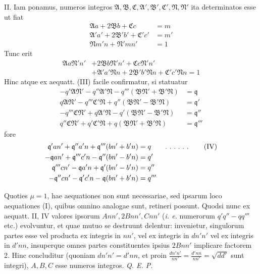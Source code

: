 II. Iam ponamus, numeros integros $\mathfrak{A},\mathfrak{B},\mathfrak{C},\mathfrak{A}',\mathfrak{B}',\mathfrak{C}',\mathfrak{N},\mathfrak{N}'$ ita determinatos esse ut fiat
\[
\begin{aligned}
\mathfrak{A}a+2\mathfrak{B}b+\mathfrak{C}c&=m\\
\mathfrak{A}'a'+2\mathfrak{B}'b'+\mathfrak{C}'c'&=m'\\
\mathfrak{N}m'n+\mathfrak{N}'mn'&=1
\end{aligned}
\]
Tunc erit
\[
\begin{aligned}\mathfrak{A}a\mathfrak{N}'n'&+2\mathfrak{B}b\mathfrak{N}'n'+\mathfrak{C}c\mathfrak{N}'n'\\&+\mathfrak{A}'a'\mathfrak{N}n+2\mathfrak{B}'b'\mathfrak{N}n+\mathfrak{C}'c'\mathfrak{N}n=1\end{aligned}
\]
Hinc atque ex aequatt. (III) facile confirmatur, si statuatur
\[
\begin{aligned}
-q'\mathfrak{A}\mathfrak{N}'-q''\mathfrak{A}'\mathfrak{N}-q'''(\mathfrak{B}\mathfrak{N}'+\mathfrak{B}'\mathfrak{N})&=\mathfrak{q}\\
q\mathfrak{A}\mathfrak{N}'-q'''\mathfrak{C}'\mathfrak{N}+q''(\mathfrak{B}\mathfrak{N}'-\mathfrak{B}'\mathfrak{N})&=\mathfrak{q}'\\
-q'''\mathfrak{C}\mathfrak{N}'+q\mathfrak{A}'\mathfrak{N}-q'(\mathfrak{B}\mathfrak{N}'-\mathfrak{B}'\mathfrak{N})&=\mathfrak{q}''\\
q''\mathfrak{C}\mathfrak{N}'+q'\mathfrak{C}'\mathfrak{N}+q(\mathfrak{B}\mathfrak{N}'+\mathfrak{B}'\mathfrak{N})&=\mathfrak{q}'''
\end{aligned}
\]
fore
\[
\begin{aligned}
\mathfrak{q}'an'+\mathfrak{q}''a'n+\mathfrak{q}'''(bn'+b'n)&=q\qquad\ldotp\,\ldotp\,\ldotp\,\ldotp\,\ldotp\,\ldotp\qquad\text{(IV)}\\
-\mathfrak{q}an'+\mathfrak{q}'''c'n-\mathfrak{q}''(bn'-b'n)&=q'\\
\mathfrak{q}'''cn'-\mathfrak{q}a'n+\mathfrak{q}'(bn'-b'n)&=q''\\
-\mathfrak{q}''cn'-\mathfrak{q}'c'n-\mathfrak{q}(bn'+b'n)&=q'''
\end{aligned}
\]

Quoties $\mu=1$, hae aequationes non sunt necessariae, sed ipsarum loco aequationes (I), quibus omnino analogae sunt, retineri possunt. Quodsi nunc ex aequatt. II, IV valores ipsorum $Ann',2Bnn',Cnn'$ (\textit{i. e.} numerorum $q'q''-qq'''$ etc.) evolvuntur, et quae mutuo se destruunt delentur: invenietur, singulorum
partes esse vel producta ex integris in $nn'$, vel ex integris in $dn'n'$ vel ex integris in $d'nn$, insuperque omnes partes constituentes ipsius $2Bnn'$ implicare factorem 2. Hinc concluditur (quoniam $dn'n'=d'nn$, et proin $\frac{dn'n'}{nn'}=\frac{d'nn}{nn'}=\sqrt{dd'}$ sunt integri), $A,B,C$ esse numeros integros. \textit{Q. E. P.}

